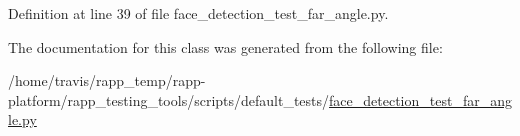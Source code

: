 Definition at line 39 of file face\-\_\-detection\-\_\-test\-\_\-far\-\_\-angle.\-py.



The documentation for this class was generated from the following file\-:\begin{DoxyCompactItemize}
\item 
/home/travis/rapp\-\_\-temp/rapp-\/platform/rapp\-\_\-testing\-\_\-tools/scripts/default\-\_\-tests/\hyperlink{face__detection__test__far__angle_8py}{face\-\_\-detection\-\_\-test\-\_\-far\-\_\-angle.\-py}\end{DoxyCompactItemize}
